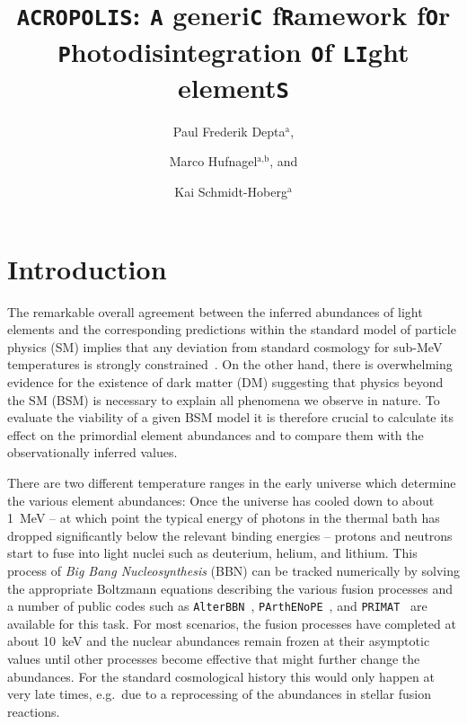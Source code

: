 \documentclass[11pt,a4paper]{article}
\title{\texttt{ACROPOLIS}: \texttt{A} generi\texttt{C} f\texttt{R}amework f\texttt{O}r \texttt{P}hotodisintegration \texttt{O}f \texttt{LI}ght element\texttt{S}}
\author{Paul Frederik Depta$^\text{a}$,}
\author{Marco Hufnagel$^{\text{a}, \text{b}}$, and}
\author{Kai Schmidt-Hoberg$^\text{a}$}
\affiliation{$^\text{a}$ DESY, Notkestra\ss e 85, D-22607 Hamburg, Germany}
\affiliation{$^\text{b}$ Service de Physique Théorique, Université Libre de Bruxelles, Boulevard du Triomphe, CP225, B-1050 Brussels, Belgium}
\begin{document}
\maketitle

\section{Introduction}

The remarkable overall agreement between the inferred abundances of light elements and the corresponding predictions within the standard model of particle physics (SM) implies that any deviation from
standard cosmology for sub-MeV temperatures is strongly constrained~\cite{Shvartsman:1969mm,Steigman:1977kc,Scherrer:1987rr,Cyburt:2015mya}. On the other hand, there is overwhelming evidence
for the existence of dark matter (DM) suggesting that physics beyond the SM (BSM) is necessary to explain all phenomena we observe in nature.
To evaluate the viability of a given BSM model it is therefore crucial to calculate its effect on the primordial element abundances and to compare them with the observationally inferred values.

There are two different temperature ranges in the early universe which determine the various element abundances:
Once the universe has cooled down to about 1~MeV -- at which point the typical energy of photons in the thermal bath has dropped significantly below the relevant binding energies --
protons and neutrons start to fuse into light nuclei such as deuterium, helium, and lithium. This process of {\it Big Bang Nucleosynthesis} (BBN) can be tracked
numerically by solving the appropriate Boltzmann equations describing the various fusion processes and a number of public codes such as \texttt{AlterBBN}~\cite{Arbey:2018zfh}, \texttt{PArthENoPE}~\cite{Pisanti:2007hk}, and \texttt{PRIMAT}~\cite{PitrouEtal2018} are available for this task. For most scenarios, the fusion processes have completed at about 10~keV and the nuclear abundances remain frozen at their asymptotic values until other processes become effective that might further change the abundances. For the standard cosmological history this would only happen at very late times, e.g.\ due to a reprocessing of the abundances in stellar fusion reactions.
\end{document}
